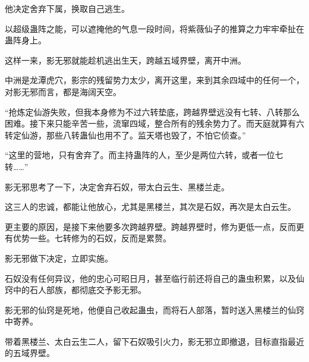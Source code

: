 \begin{this_body}
他决定舍弃下属，换取自己逃生。

以超级蛊阵之能，可以遮掩他的气息一段时间，将紫薇仙子的推算之力牢牢牵扯在蛊阵身上。

这样一来，影无邪就能趁机逃出生天，跨越五域界壁，离开中洲。

中洲是龙潭虎穴，影宗的残留势力太少，离开这里，来到其余四域中的任何一个，对影无邪而言，都是海阔天空。

“抢炼定仙游失败，但我本身修为不过六转垫底，跨越界壁远没有七转、八转那么困难。接下来只能辛苦一些，流窜四域，整合所有的残余势力了。而天庭就算有六转定仙游，那些八转蛊仙也用不了。监天塔也毁了，不怕它侦查。”

“这里的营地，只有舍弃了。而主持蛊阵的人，至少是两位六转，或者一位七转……”

影无邪思考了一下，决定舍弃石奴，带太白云生、黑楼兰走。

这三人的忠诚，都能让他放心，尤其是黑楼兰，其次是石奴，再次是太白云生。

更主要的原因，是接下来他要多次跨越界壁。跨越界壁时，修为更低一点，反而更有优势一些。七转修为的石奴，反而是累赘。

影无邪做下决定，立即实施。

石奴没有任何异议，他的忠心可昭日月，甚至临行前还将自己的蛊虫积累，以及仙窍中的石人部族，都彻底交予影无邪。

影无邪的仙窍是死地，他便自己收起蛊虫，而将石人部落，暂时送入黑楼兰的仙窍中寄养。

带着黑楼兰、太白云生二人，留下石奴吸引火力，影无邪立即撤退，目标直指最近的五域界壁。

\end{this_body}

